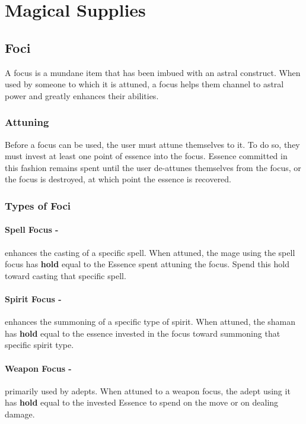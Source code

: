 \section{Magical Supplies}

\subsection{Foci}
A focus is a mundane item that has been imbued with an astral construct. When used by someone to which it is attuned, a focus helps them channel to astral power and greatly enhances their abilities.

\subsubsection{Attuning}
Before a focus can be used, the user must attune themselves to it. To do so, they must invest at least one point of essence into the focus. Essence committed in this fashion remains spent until the user de-attunes themselves from the focus, or the focus is destroyed, at which point the essence is recovered.

\subsubsection{Types of Foci}
\paragraph{Spell Focus -} enhances the casting of a specific spell. When attuned, the mage using the spell focus has \textsf{\textbf{hold}} equal to the Essence spent attuning the focus. Spend this hold toward casting that specific spell.

\paragraph{Spirit Focus -} enhances the summoning of a specific type of spirit. When attuned, the shaman has \textsf{\textbf{hold}} equal to the essence invested in the focus toward summoning that specific spirit type.

\paragraph{Weapon Focus -} primarily used by adepts. When attuned to a weapon focus, the adept using it has \textsf{\textbf{hold}} equal to the invested Essence to spend on the  move or on dealing damage.

